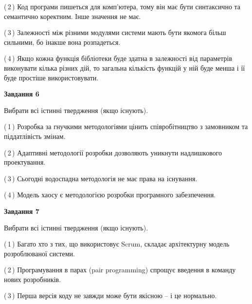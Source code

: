 \documentclass[10pt, ukrainian]{article}
\begin{document}
{\begin {large}
(\,2\,) Код програми пишеться для комп'ютера, тому він має бути синтаксично та семантично коректним. Інше значення не має. %



(\,3\,) Залежності між різними модулями системи мають бути якомога більш сильними, бо інакше вона розпадеться. %



(\,4\,) Якщо кожна функція бібліотеки буде здатна в залежності від параметрів виконувати кілька різних дій, то загальна кількість функцій у ній буде менша і її буде простіше використовувати. %

\newpage

{\begin {center}\textbf{Завдання 6}\end {center}}\par
Вибрати всі істинні твердження (якщо існують).\par
\vspace{2mm}



(\,1\,) Розробка за гнучкими методологіями цінить співробітництво з замовником та піддатлівість змінам. %



(\,2\,) Адаптивні методології розробки дозволяють уникнути надлишкового проектування. %



(\,3\,) Сьогодні водоспадна методологія не має права на існування. %



(\,4\,) Модель хаосу є методологією розробки програмного забезпечення. %


{\begin {center}\textbf{Завдання 7}\end {center}}\par
Вибрати всі істинні твердження (якщо існують).\par
\vspace{2mm}



(\,1\,) Багато хто з тих, що використовує Scrum, складає архітектурну модель розроблюваної системи. %



(\,2\,) Програмування в парах (pair programming) спрощує введення в команду нових розробників. %



(\,3\,) Перша версія коду не завжди може бути якісною -- і це нормально. %




\end{large}}
\end{document}
